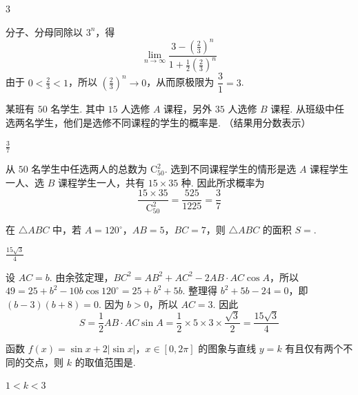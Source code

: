 \begin{answer}
\(3\)
\end{answer}

\begin{solution}
分子、分母同除以 \(3^n\)，得
\[
\lim_{n\to\infty}\frac{3-\left(\frac23\right)^n}{1+\frac12\left(\frac23\right)^n}
\]
由于 \(0<\frac23<1\)，所以 \(\left(\frac23\right)^n\to0\)，从而原极限为 \(\dfrac{3}{1}=3\).
\end{solution}

\begin{problem}
某班有 \(50\) 名学生. 其中 \(15\) 人选修 \(A\) 课程，另外 \(35\) 人选修 \(B\) 课程. 从班级中任选两名学生，他们是选修不同课程的学生的概率是\fillinblank{}. （结果用分数表示）
\end{problem}

\begin{answer}
\(\frac{3}{7}\)
\end{answer}

\begin{solution}
从 \(50\) 名学生中任选两人的总数为 \(\mathrm C_{50}^{2}\). 选到不同课程学生的情形是选 \(A\) 课程学生一人、选 \(B\) 课程学生一人，共有 \(15\times35\) 种. 因此所求概率为
\[
\frac{15\times35}{\mathrm C_{50}^{2}}=\frac{525}{1225}=\frac37
\]
\end{solution}

\begin{problem}
在 \(\triangle ABC\) 中，若 \(A = 120^{\circ}\)，\(AB = 5\)，\(BC = 7\)，则 \(\triangle ABC\) 的面积 \(S =\)\fillinblank{}.
\end{problem}

\begin{answer}
\(\frac{15\sqrt{3}}{4}\)
\end{answer}

\begin{solution}
设 \(AC=b\). 由余弦定理，\(BC^2=AB^2+AC^2-2AB\cdot AC\cos A\)，所以 \(49=25+b^2-10b\cos120^{\circ}=25+b^2+5b\). 整理得 \(b^2+5b-24=0\)，即 \((b-3)(b+8)=0\). 因为 \(b>0\)，所以 \(AC=3\). 因此
\[
S=\frac12 AB\cdot AC\sin A=\frac12\times5\times3\times\frac{\sqrt3}{2}=\frac{15\sqrt3}{4}
\]
\end{solution}

\begin{problem}
函数 \(f(x) = \sin x + 2|\sin x|\)，\(x \in [0, 2\pi]\) 的图象与直线 \( y = k \) 有且仅有两个不同的交点，则 \( k \) 的取值范围是\fillinblank{}.
\end{problem}

\begin{answer}
\(1<k<3\)
\end{answer}

